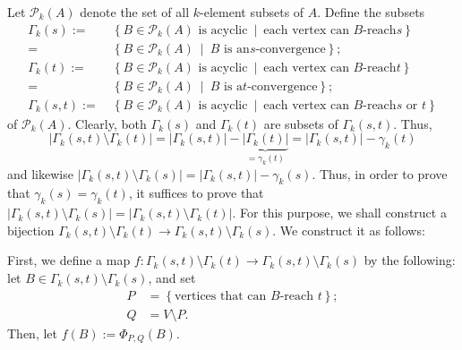 \documentclass[numbers=enddot,12pt,final,onecolumn,notitlepage]{scrartcl}%
\theoremstyle{definition}
\theoremstyle{plainsl}
\begin{document}
Let $\mathcal{P}_{k}\left(  A\right)  $ denote the set of all $k$-element
subsets of $A$. Define the subsets
\begin{align*}
\Gamma_{k}\left(  s\right)  :=  &  \ \left\{  B\in\mathcal{P}_{k}\left(
A\right)  \text{ is acyclic}\ \mid\ \text{each vertex can }B\text{-reach
}s\right\} \\
=  &  \ \left\{  B\in\mathcal{P}_{k}\left(  A\right)  \ \mid\ B\text{ is an
}s\text{-convergence}\right\}  ;\\
\Gamma_{k}\left(  t\right)  :=  &  \ \left\{  B\in\mathcal{P}_{k}\left(
A\right)  \text{ is acyclic}\ \mid\ \text{each vertex can }B\text{-reach
}t\right\} \\
=  &  \ \left\{  B\in\mathcal{P}_{k}\left(  A\right)  \ \mid\ B\text{ is a
}t\text{-convergence}\right\}  ;\\
\Gamma_{k}\left(  s,t\right)  :=  &  \ \left\{  B\in\mathcal{P}_{k}\left(
A\right)  \text{ is acyclic}\ \mid\ \text{each vertex can }B\text{-reach
}s\text{ or }t\right\}
\end{align*}
of $\mathcal{P}_{k}\left(  A\right)  $. Clearly, both $\Gamma_{k}\left(
s\right)  $ and $\Gamma_{k}\left(  t\right)  $ are subsets of $\Gamma
_{k}\left(  s,t\right)  $. Thus,
\[
\left\vert \Gamma_{k}\left(  s,t\right)  \setminus\Gamma_{k}\left(  t\right)
\right\vert =\left\vert \Gamma_{k}\left(  s,t\right)  \right\vert
-\underbrace{\left\vert \Gamma_{k}\left(  t\right)  \right\vert }_{=\gamma
_{k}\left(  t\right)  }=\left\vert \Gamma_{k}\left(  s,t\right)  \right\vert
-\gamma_{k}\left(  t\right)
\]
and likewise $\left\vert \Gamma_{k}\left(  s,t\right)  \setminus\Gamma
_{k}\left(  s\right)  \right\vert =\left\vert \Gamma_{k}\left(  s,t\right)
\right\vert -\gamma_{k}\left(  s\right)  $. Thus, in order to prove that
$\gamma_{k}\left(  s\right)  =\gamma_{k}\left(  t\right)  $, it suffices to
prove that $\left\vert \Gamma_{k}\left(  s,t\right)  \setminus\Gamma
_{k}\left(  s\right)  \right\vert =\left\vert \Gamma_{k}\left(  s,t\right)
\setminus\Gamma_{k}\left(  t\right)  \right\vert $. For this purpose, we shall
construct a bijection $\Gamma_{k}\left(  s,t\right)  \setminus\Gamma
_{k}\left(  t\right)  \rightarrow\Gamma_{k}\left(  s,t\right)  \setminus
\Gamma_{k}\left(  s\right)  $. We construct it as follows:

First, we define a map $f : \Gamma_{k}(s,t) \setminus\Gamma_{k}(t) \to
\Gamma_{k}(s,t) \setminus\Gamma_{k}(s)$ by the following: let $B \in\Gamma
_{k}(s,t) \setminus\Gamma_{k}(s)$, and set%
\begin{align*}
P  &  =\left\{  \text{vertices that can }B\text{-reach }t\right\}  ;\\
Q  &  =V\setminus P.
\end{align*}
Then, let $f(B) := \Phi_{P,Q}(B)$.
\end{document}
